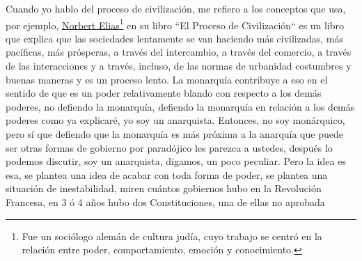 Cuando yo hablo del proceso de civilización, me refiero a los conceptos que usa, por ejemplo, \href{https://en.wikipedia.org/wiki/Norbert_Elias}{Norbert Elias}\footnote{Fue un sociólogo alemán de cultura judía, cuyo trabajo se centró en la relación entre poder, comportamiento, emoción y conocimiento.} en su libro ``El Proceso de Civilización``\cite{elias1939civilizing} es un libro que explica que las sociedades lentamente se van haciendo más civilizadas, más pacíficas, más prósperas, a través del intercambio, a través del comercio, a través de las interacciones y a través, incluso, de las normas de urbanidad costumbres y buenas maneras y es un proceso lento. La monarquía contribuye a eso en el sentido de que es un poder relativamente blando con respecto a los demás poderes, no defiendo la monarquía, defiendo la monarquía en relación a los demás poderes como ya explicaré, yo soy un anarquista. Entonces, no soy monárquico, pero sí que defiendo que la monarquía es más próxima a la anarquía que puede ser otras formas de gobierno por paradójico les parezca a ustedes, después lo podemos discutir, soy un anarquista, digamos, un poco peculiar. Pero la idea es esa, se plantea una idea de acabar con toda forma de poder, se plantea una situación de inestabilidad, miren cuántos gobiernos hubo en la Revolución Francesa, en 3 ó 4 años hubo dos Constituciones, una de ellas no aprobada
